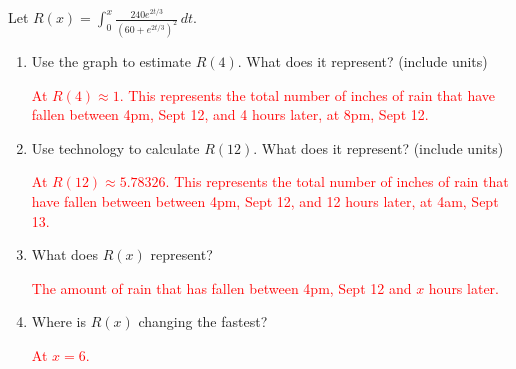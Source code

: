 \documentclass[letterpaper,11pt]{article}
\def\ds{\displaystyle}
\newcommand{\sol}[1]{\textcolor{red}{#1}}
\newcommand{\sol}[1]{\textcolor{white}{#1}}
\begin{document}
\begin{enumerate}
Let $\ds R(x)=\int_0^x \frac{240e^{2t/3}}{\left( 60+e^{2t/3} \right)^2} \,dt$.

\begin{enumerate}
\item Use the graph to estimate $R(4)$. What does it represent? (include units)

\sol{At $R(4) \approx 1$. This represents the total number of inches of rain that have fallen between 4pm, Sept 12, and 4 hours later, at 8pm, Sept 12.}
\vfill

\item Use technology to calculate $R(12)$. What does it represent? (include units)

\sol{At $R(12) \approx 5.78326$. This represents the total number of inches of rain that have fallen between between 4pm, Sept 12, and 12 hours later, at 4am, Sept 13.}
\vfill

\item What does $R(x)$ represent?

\sol{The amount of rain that has fallen between 4pm, Sept 12 and $x$ hours later.}
\vfill

\item Where is $R(x)$ changing the fastest?

\sol{At $x=6$.}
\vfill

\end{enumerate}
\end{enumerate}
\end{document}
